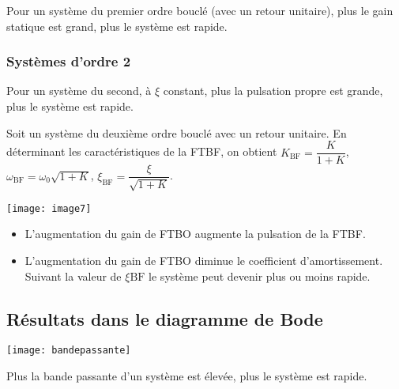 \begin{resultat}
Pour un système du premier ordre bouclé (avec un retour unitaire), plus le gain statique est grand, plus le système est rapide. 
\end{resultat}

\subsubsection{Systèmes d'ordre 2}

\begin{resultat}
Pour un système du second, à $\xi$ constant, plus la pulsation propre est grande, plus le système est rapide. 
\end{resultat} 


Soit un système du deuxième ordre bouclé avec un retour unitaire. En déterminant les caractéristiques de la FTBF, on obtient $K_{\text{BF}}=\dfrac{K}{1+K}$, $\omega_{\text{BF}}=\omega_0\sqrt{1+K}$, $\xi_{\text{BF}}=\dfrac{\xi}{\sqrt{1+K}}$.

\begin{marginfigure}
\centering
\texttt{[image: image7]}
\end{marginfigure}

\begin{resultat}
\begin{itemize}
\item L'augmentation du gain de FTBO augmente la pulsation de la FTBF. 
\item L'augmentation du gain de FTBO diminue le coefficient d'amortissement. Suivant la valeur de $\xi{\text{BF}}$ le système peut devenir plus ou moins rapide.  
\end{itemize}
\end{resultat}



\subsection{Résultats dans le diagramme de Bode}


\begin{marginfigure}
\centering
\texttt{[image: bandepassante]}
\end{marginfigure}

\begin{resultat}
Plus la bande passante d'un système est élevée, plus le système est rapide.
\end{resultat}


